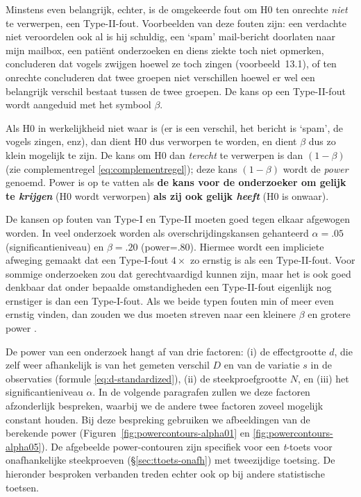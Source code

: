 \documentclass[
]{book}
\begin{document}
Minstens even belangrijk, echter, is de omgekeerde fout om H0 ten
onrechte \emph{niet} te verwerpen, een Type-II-fout. Voorbeelden van deze
fouten zijn: een verdachte niet veroordelen ook al is hij schuldig, een
`spam' mail-bericht doorlaten naar mijn mailbox, een patiënt onderzoeken
en diens ziekte toch niet opmerken, concluderen dat vogels zwijgen
hoewel ze toch zingen
(voorbeeld~13.1), of ten onrechte concluderen dat twee
groepen niet verschillen hoewel er wel een belangrijk verschil bestaat
tussen de twee groepen. De kans op een Type-II-fout wordt aangeduid met
het symbool \(\beta\).

Als H0 in werkelijkheid niet waar is (er is een verschil, het bericht is
`spam', de vogels zingen, enz), dan dient H0 dus verworpen te worden, en
dient \(\beta\) dus zo klein mogelijk te zijn. De kans om H0 dan \emph{terecht}
te verwerpen is dan \((1-\beta)\) (zie complementregel \eqref{eq:complementregel});
deze kans \((1-\beta)\) wordt de \emph{power}
genoemd. Power is op te vatten als \textbf{de kans voor de onderzoeker om gelijk
te \emph{krijgen}} (H0 wordt verworpen) \textbf{als zij ook gelijk \emph{heeft}} (H0 is onwaar).

De kansen op fouten van Type-I en Type-II moeten goed tegen elkaar
afgewogen worden. In veel onderzoek worden als overschrijdingskansen
gehanteerd \(\alpha=.05\) (significantieniveau) en \(\beta=.20\)
(power=\(.80\)). Hiermee wordt een impliciete afweging gemaakt dat een
Type-I-fout \(4\times\) zo ernstig is als een Type-II-fout. Voor sommige
onderzoeken zou dat gerechtvaardigd kunnen zijn, maar het is ook goed
denkbaar dat onder bepaalde omstandigheden een Type-II-fout eigenlijk
nog ernstiger is dan een Type-I-fout. Als we beide typen fouten min of
meer even ernstig vinden, dan zouden we dus moeten streven naar een
kleinere \(\beta\) en grotere power \citep{Rose08}.

De power van een onderzoek hangt af van drie factoren: (i) de
effectgrootte \(d\), die zelf weer afhankelijk is van het gemeten verschil
\(D\) en van de variatie \(s\) in de observaties
(formule \eqref{eq:d-standardized}), (ii) de steekproefgrootte \(N\), en (iii)
het significantieniveau \(\alpha\). In de volgende paragrafen zullen we
deze factoren afzonderlijk bespreken, waarbij we de andere twee factoren
zoveel mogelijk constant houden. Bij deze bespreking gebruiken we
afbeeldingen van de berekende power
(Figuren~\ref{fig:powercontours-alpha01} en
\ref{fig:powercontours-alpha05}). De afgebeelde power-contouren
zijn specifiek voor een \emph{t}-toets voor onafhankelijke steekproeven
(§\ref{sec:ttoets-onafh}) met tweezijdige toetsing. De hieronder
besproken verbanden treden echter ook op bij andere statistische
toetsen.
\end{document}
